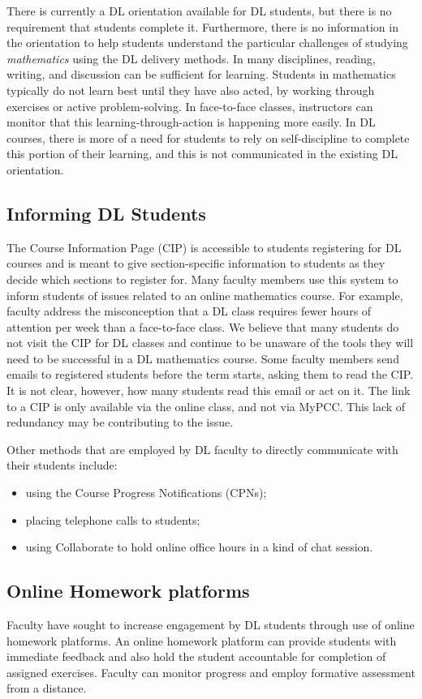 There is currently a DL orientation available for DL students, but there is no requirement that students complete it. Furthermore, there is no information in the orientation to help students understand the particular challenges of studying \emph{mathematics} using the DL delivery methods.  In many disciplines, reading, writing, and discussion can be sufficient for learning. Students in mathematics typically do not learn best until they have also acted, by working through exercises or active problem-solving. In face-to-face classes, instructors can monitor that this learning-through-action is happening more easily. In DL courses, there is more of a need for students to rely on self-discipline to complete this portion of their learning, and this is not communicated in the existing DL orientation.


\subsection{Informing DL Students}
The Course Information Page (CIP) is accessible to students registering for DL courses and is meant to give section-specific information to students as they decide which sections to register for.   Many faculty members use this system to inform students of issues related to an online mathematics course.  For example, faculty address the misconception that a DL class requires fewer hours of attention per week than a face-to-face class. We believe that many students do not visit the CIP for DL classes and continue to be unaware of the tools they will need to be successful in a DL mathematics course.   Some faculty members send emails to registered students before the term starts, asking them to read the CIP.  It is not clear, however, how many students read this email or act on it.  The link to a CIP is only available via the online class, and not via MyPCC. This lack of redundancy may be contributing to the issue.

Other methods that are employed by DL faculty to directly communicate with their students include:
\begin{itemize}
\item using the Course Progress Notifications (CPNs);
\item placing telephone calls to students;
\item using Collaborate to hold online office hours in a kind of chat session.
\end{itemize}

\subsection{Online Homework platforms}
Faculty have sought to increase engagement by DL students through use of online homework platforms. An online homework platform can provide students with immediate feedback and also hold the student accountable for completion of assigned exercises. Faculty can monitor progress and employ formative assessment from a distance.

